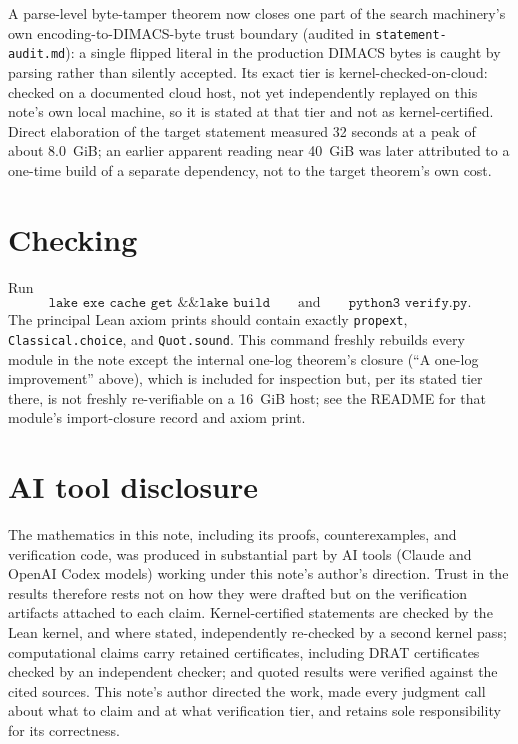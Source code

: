 \documentclass[10pt]{article}
\theoremstyle{plain}
\begin{document}
A parse-level byte-tamper theorem now closes one part of the search
machinery's own encoding-to-DIMACS-byte trust boundary (audited in
\texttt{statement-audit.md}): a single flipped literal in the production
DIMACS bytes is caught by parsing rather than silently accepted. Its exact
tier is kernel-checked-on-cloud: checked on a documented cloud host, not yet
independently replayed on this note's own local machine, so it is stated at
that tier and not as kernel-certified. Direct elaboration of the target
statement measured 32 seconds at a peak of about 8.0~GiB; an earlier apparent
reading near 40~GiB was later attributed to a one-time build of a separate
dependency, not to the target theorem's own cost.

\section*{Checking}

Run
\[
\texttt{lake exe cache get \&\& lake build}
\qquad\text{and}\qquad
\texttt{python3 verify.py}.
\]
The principal Lean axiom prints should contain exactly
\texttt{propext}, \texttt{Classical.choice}, and \texttt{Quot.sound}.
This command freshly rebuilds every module in the note except the internal
one-log theorem's closure (``A one-log improvement'' above), which is included
for inspection but, per its stated tier there, is not freshly re-verifiable on
a 16~GiB host; see the README for that module's import-closure record and
axiom print.

\section*{AI tool disclosure}

The mathematics in this note, including its proofs, counterexamples, and
verification code, was produced in substantial part by AI tools (Claude and
OpenAI Codex models) working under this note's author's direction. Trust in
the results therefore rests not on how they were drafted but on the
verification artifacts attached to each claim. Kernel-certified statements
are checked by the Lean kernel, and where stated, independently re-checked by
a second kernel pass; computational claims carry retained certificates,
including DRAT certificates checked by an independent checker; and quoted
results were verified against the cited sources. This note's author directed
the work, made every judgment call about what to claim and at what
verification tier, and retains sole responsibility for its correctness.
\end{document}
